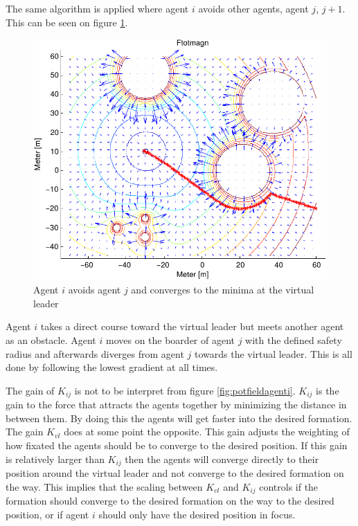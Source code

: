 \documentclass[a4paper,conference]{IEEEtran}
\begin{document}

The same algorithm is applied where agent $i$ avoids other agents,
agent $j$, $j+1$. This can be seen on figure \ref{fig:avoidagent}.

\begin{figure}[htbp]
  \includegraphics[width=.9\linewidth]{fig/ftotmagnfigpdf}
	\caption{Agent $i$ avoids agent $j$ and converges to the minima at
		the virtual leader}
  \label{fig:avoidagent}
\end{figure}

Agent $i$ takes a direct course toward the virtual leader but meets
another agent as an obstacle. Agent $i$ moves on the boarder of agent
$j$ with the defined safety radius and afterwards diverges from agent
$j$ towards the virtual leader. This is all done by following the
lowest gradient at all times.

The gain of $K_{ij}$ is not to be interpret from figure
\ref{fig:potfieldagenti}. $K_{ij}$ is the gain to the force that
attracts the agents together by minimizing the distance in between
them. By doing this the agents will get faster into the desired
formation. The gain $K_{vl}$ does at some point the opposite. This
gain adjusts the weighting of how fixated the agents should be to
converge to the desired position. If this gain is relatively larger
than $K_{ij}$ then the agents will converge directly to their position
around the virtual leader and not converge to the desired formation on
the way. This implies that the scaling between $K_{vl}$ and $K_{ij}$
controls if the formation should converge to the desired formation on
the way to the desired position, or if agent $i$ should only have the
desired position in focus.
\end{document}
